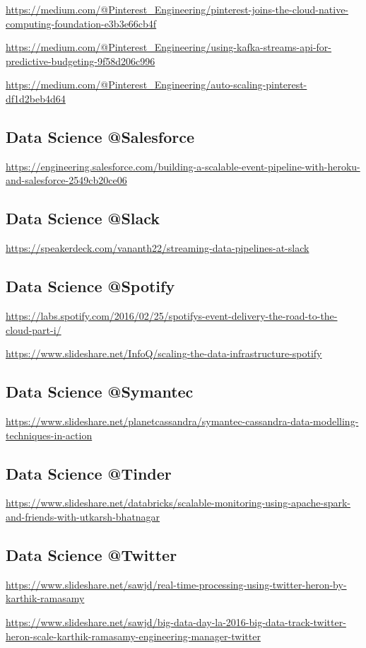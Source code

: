\documentclass[12pt]{scrartcl} %
\begin{document}
\url{https://medium.com/@Pinterest_Engineering/pinterest-joins-the-cloud-native-computing-foundation-e3b3e66cb4f}

\url{https://medium.com/@Pinterest_Engineering/using-kafka-streams-api-for-predictive-budgeting-9f58d206c996}

\url{https://medium.com/@Pinterest_Engineering/auto-scaling-pinterest-df1d2beb4d64}

\subsection{Data Science @Salesforce}
\url{https://engineering.salesforce.com/building-a-scalable-event-pipeline-with-heroku-and-salesforce-2549cb20ce06}

\subsection{Data Science @Slack}
\url{https://speakerdeck.com/vananth22/streaming-data-pipelines-at-slack}

\subsection{Data Science @Spotify}
\url{https://labs.spotify.com/2016/02/25/spotifys-event-delivery-the-road-to-the-cloud-part-i/}

\url{https://www.slideshare.net/InfoQ/scaling-the-data-infrastructure-spotify}

\subsection{Data Science @Symantec}
\url{https://www.slideshare.net/planetcassandra/symantec-cassandra-data-modelling-techniques-in-action}

\subsection{Data Science @Tinder}
\url{https://www.slideshare.net/databricks/scalable-monitoring-using-apache-spark-and-friends-with-utkarsh-bhatnagar}

\subsection{Data Science @Twitter}
\url{https://www.slideshare.net/sawjd/real-time-processing-using-twitter-heron-by-karthik-ramasamy}

\url{https://www.slideshare.net/sawjd/big-data-day-la-2016-big-data-track-twitter-heron-scale-karthik-ramasamy-engineering-manager-twitter}
\end{document}

